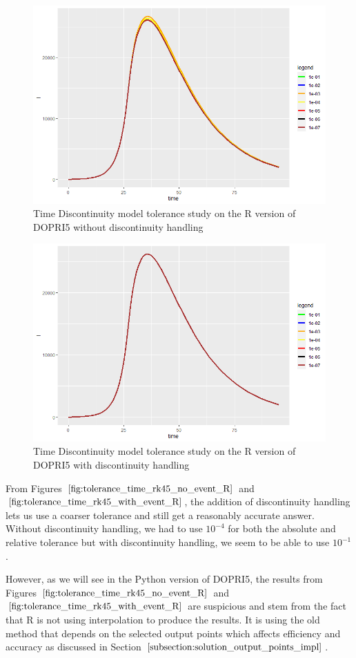 \begin{figure}[h]
\centering
\includegraphics[width=0.7\linewidth]{./figures/tolerance_time_rk45_no_event_R}
\caption{Time Discontinuity model tolerance study on the R version of DOPRI5 without discontinuity handling}
\label{fig:tolerance_time_rk45_no_event_R}
\end{figure}

\begin{figure}[h]
\centering
\includegraphics[width=0.7\linewidth]{./figures/tolerance_time_rk45_with_event_R}
\caption{Time Discontinuity model tolerance study on the R version of DOPRI5 with discontinuity handling}
\label{fig:tolerance_time_rk45_with_event_R}
\end{figure}

From Figures $\ref{fig:tolerance_time_rk45_no_event_R}$ and $\ref{fig:tolerance_time_rk45_with_event_R}$, the addition of discontinuity handling lets us use a coarser tolerance and still get a reasonably accurate answer. Without discontinuity handling, we had to use $10^{-4}$ for both the absolute and relative tolerance but with discontinuity handling, we seem to be able to use $10^{-1}$. 

However, as we will see in the Python version of DOPRI5, the results from Figures $\ref{fig:tolerance_time_rk45_no_event_R}$ and $\ref{fig:tolerance_time_rk45_with_event_R}$ are suspicious and stem from the fact that R is not using interpolation to produce the results. It is using the old method that depends on the selected output points which affects efficiency and accuracy as discussed in Section $\ref{subsection:solution_output_points_impl}$. 


